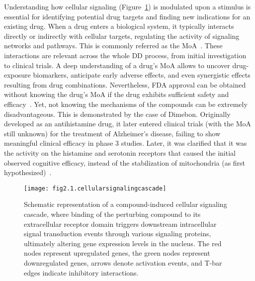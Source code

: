 Understanding how cellular signaling (Figure~\ref{fig:fig2.1.cellularsignalingcascade}) is modulated upon a stimulus is essential for identifying potential drug targets and finding new indications for an existing drug. 
When a drug enters a biological system, it typically interacts directly or indirectly with cellular targets, regulating the activity of signaling networks and pathways. 
This is commonly referred as the \gls{MoA}~\cite{RN52, RN53}. These interactions are relevant across the whole \gls{DD} process, from initial investigation to clinical trials. A deep understanding of a drug's \gls{MoA} allows to uncover drug-exposure biomarkers, anticipate early adverse effects, and even synergistic effects resulting from drug combinations. 
Nevertheless, FDA approval can be obtained without knowing the drug's \gls{MoA} if the drug exhibits sufficient safety and efficacy~\cite{RN38, RN68}. 
Yet, not knowing the mechanisms of the compounds can be extremely disadvantageous. This is demonstrated by the case of Dimebon. 
Originally developed as an antihistamine drug, it later entered clinical trials (with the \gls{MoA} still unknown) for the treatment of Alzheimer's disease, failing to show meaningful clinical efficacy in phase 3 studies. 
Later, it was clarified that it was the activity on the histamine and serotonin receptors that caused the initial observed cognitive efficacy, instead of the stabilization of mitochondria (as first hypothesized)~\cite{RN38, RN69}.

\begin{figure}[htbp]
    \centering
    \texttt{[image: fig2.1.cellularsignalingcascade]}
    \caption[Schematic representation of a compound-induced cellular signaling cascade.]{Schematic representation of a compound-induced cellular signaling cascade, where binding of the perturbing compound to its extracellular receptor domain triggers downstream intracellular signal transduction events through various signaling proteins, ultimately altering gene expression levels in the nucleus. The red nodes represent upregulated genes, the green nodes represent downregulated genes, arrows denote activation events, and T-bar edges indicate inhibitory interactions.}
    \label{fig:fig2.1.cellularsignalingcascade}
\end{figure}

